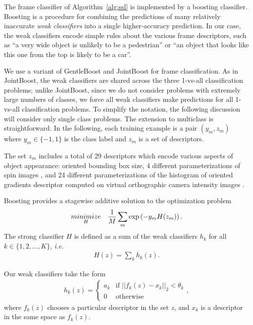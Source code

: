 \documentclass[conference]{IEEEtran}
\begin{document}
The frame classifier \C of Algorithm~\ref{alg:ssl} is implemented by a boosting classifier.  Boosting is a procedure for combining the predictions of many relatively inaccurate \textit{weak classifiers} into a single higher-accuracy prediction. In our case, the weak classifiers encode simple rules about the various frame descriptors, such as ``a very wide object is unlikely to be a pedestrian'' or ``an object that looks like this one from the top is likely to be a car''.

We use a variant of GentleBoost \cite{Friedman2000} and JointBoost \cite{Torralba2004} for frame classification.  As in JointBoost, the weak classifiers are shared across the three 1-vs-all classification problems; unlike JointBoost, since we do not consider problems with extremely large numbers of classes, we force all weak classifiers make predictions for all 1-vs-all classification problems.  To simplify the notation, the following discussion will consider only single class problems.   The extension to multiclass is straightforward.  In the following, each training example is a pair $(y_m, z_m)$ where $y_m \in \{-1, 1\}$ is the class label and $z_m$ is a set of descriptors.

The set $z_m$ includes a total of 29 descriptors which encode various aspects of object appearance: oriented bounding box size, 4 different parameterizations of spin images \cite{Johnson1999}, and 24 different parameterizations of the histogram of oriented gradients \cite{Dalal2005} descriptor computed on virtual orthographic camera intensity images \cite{Teichman2011}.

Boosting provides a stagewise additive solution to the optimization problem
\begin{align}
  \minimize{H} \quad \frac{1}{M} \sum_m \exp \left(-y_m H(z_m) \right).     \label{eqn:boosting}
\end{align}
The strong classifier $H$ is defined as a sum of the weak classifiers $h_k$ for all $k \in \{1, 2, \dots, K\}$, \textit{i.e.}
\begin{align*}
  H(z) = \sum_k h_k(z).
\end{align*}

Our weak classifiers take the form
\begin{eqnarray*}
  h_k(z) = \begin{cases}
    a_k & \text{if $||f_k(z) - x_k||_2 < \theta_k$} \\
    0 & \text{otherwise}
  \end{cases},
\end{eqnarray*}
where $f_k(z)$ chooses a particular descriptor in the set $z$, and $x_k$ is a descriptor in the same space as $f_k(z)$.
\end{document}
